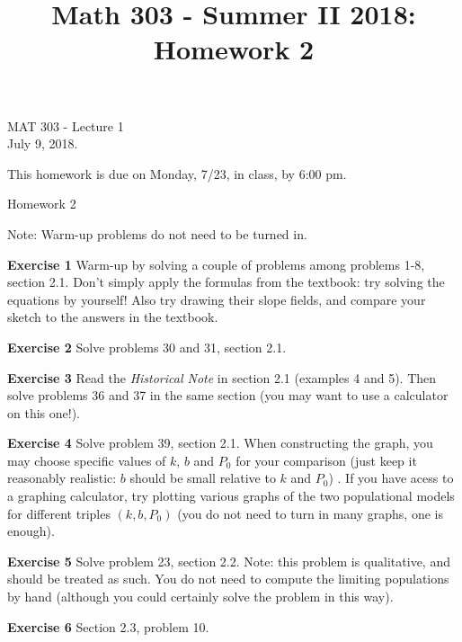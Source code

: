 \documentclass[12pt,oneside]{exam}
\title{Math 303 - Summer II 2018: Homework 2}
\newenvironment{exercise}[1]{\vspace{.1in}\noindent\textbf{Exercise #1 \hspace{.05em}}}{}
\begin{document}
\begin{flushright}
\sc MAT 303 - Lecture 1\\
July 9, 2018.
\end{flushright}
\bigskip

This homework is due on Monday, 7/23, in class, by 6:00 pm. 
\begin{center}
\textsf{Homework 2} 
\end{center}


Note: Warm-up problems do not need to be turned in. 

\begin{exercise}{1}
Warm-up by solving a couple of problems among problems 1-8, section 2.1. Don't simply apply the formulas from the textbook: try solving the equations by yourself! Also try drawing their slope fields, and compare your sketch to the answers in the textbook.
\end{exercise}

\begin{exercise}{2}
Solve problems 30 and 31, section 2.1. 
\end{exercise}

\begin{exercise}{3}
Read the \textit{Historical Note} in section 2.1 (examples 4 and 5). Then solve problems 36 and 37 in the same section (you may want to use a calculator on this one!). 
\end{exercise}

\begin{exercise}{4} 
Solve problem 39, section 2.1. When constructing the graph, you may choose specific values of $k$, $b$ and $P_0$ for your comparison (just keep it reasonably realistic: $b$ should be small relative to $k$ and $P_0$) . If you have acess to a graphing calculator, try plotting various graphs of the two populational models for different triples $(k,b,P_0)$ (you do not need to turn in many graphs, one is enough). 
\end{exercise}

\begin{exercise}{5}
Solve problem 23, section 2.2. Note: this problem is qualitative, and should be treated as such. You do not need to compute the limiting populations by hand (although you could certainly solve the problem in this way). 
\end{exercise}

\begin{exercise}{6} 
Section 2.3, problem 10. 
\end{exercise}
\end{document}
